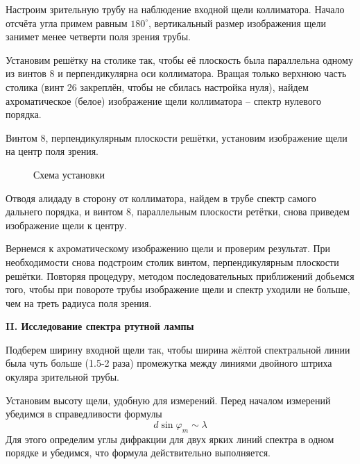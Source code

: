 \documentclass[14pt]{article}
\begin{document}
Настроим зрительную трубу на наблюдение входной щели коллиматора. Начало отсчёта угла примем равным $180^\circ$, вертикальный размер изображения щели занимет менее четверти поля зрения трубы.

Установим решётку на столике так, чтобы её плоскость была параллельна одному из винтов 8 и перпендикулярна оси коллиматора. Вращая только верхнюю часть столика (винт 26 закреплён, чтобы не сбилась настройка нуля), найдем ахроматическое (белое) изображение щели коллиматора -- спектр нулевого порядка.

Винтом 8, перпендикулярным плоскости решётки, установим изображение щели на центр поля зрения.

\begin{figure}[h!]
	\caption{Схема установки}
	\label{fig:image}
\end{figure}

Отводя алидаду в сторону от коллиматора, найдем в трубе спектр самого дальнего порядка, и винтом 8, параллельным плоскости ретётки, снова приведем изображение щели к центру.

Вернемся к ахроматическому изображению щели и проверим результат. При необходимости снова подстроим столик винтом, перпендикулярным плоскости решётки. Повторяя процедуру, методом последовательных приближений добьемся того, чтобы при повороте трубы изображение щели и спектр уходили не больше, чем на треть радиуса поля зрения.

\vspace{1cm}
\textbf{II. Исследование спектра ртутной лампы}

Подберем ширину входной щели так, чтобы ширина жёлтой спектральной линии была чуть больше (1.5-2 раза) промежутка между линиями двойного штриха окуляра зрительной трубы.

Установим высоту щели, удобную для измерений. Перед началом измерений убедимся в справедливости формулы
$$
	d\sin\varphi_m \sim \lambda
$$
Для этого определим углы дифракции для двух ярких линий спектра в одном порядке и убедимся, что формула действительно выполняется.
\end{document}
